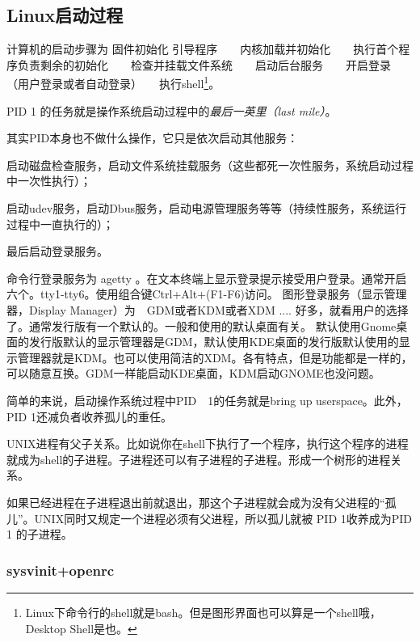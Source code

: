 \documentclass[amstex,twoside]{ctexbook}
\newenvironment{insertnote}{ \ttfamily\CJKfamily{KaiTi} }{\vskip 0.5cm }
\begin{document}
\begin{insertnote}
\subsection*{Linux启动过程}
计算机的启动步骤为 固件初始化 \textrightarrow 引导程序　\textrightarrow　内核加载并初始化　\textrightarrow　执行首个程序负责剩余的初始化　\textrightarrow　检查并挂载文件系统　\textrightarrow　启动后台服务　\textrightarrow　开启登录　\textrightarrow　（用户登录或者自动登录）　\textrightarrow　执行shell\footnote{Linux下命令行的shell就是bash。但是图形界面也可以算是一个shell哦，Desktop Shell是也。}。

PID 1 的任务就是操作系统启动过程中的{\em 最后一英里（last mile）}。

其实PID本身也不做什么操作，它只是依次启动其他服务：

启动磁盘检查服务，启动文件系统挂载服务（这些都死一次性服务，系统启动过程中一次性执行）；

启动udev服务，启动Dbus服务，启动电源管理服务等等（持续性服务，系统运行过程中一直执行的）；

最后启动登录服务。

命令行登录服务为 agetty 。在文本终端上显示登录提示接受用户登录。通常开启六个。tty1-tty6。使用组合键Ctrl+Alt+(F1-F6)访问。
图形登录服务（显示管理器，Display Manager）为　GDM或者KDM或者XDM .... 好多，就看用户的选择了。通常发行版有一个默认的。一般和使用的默认桌面有关。
默认使用Gnome桌面的发行版默认的显示管理器是GDM，默认使用KDE桌面的发行版默认使用的显示管理器就是KDM。也可以使用简洁的XDM。各有特点，但是功能都是一样的，可以随意互换。GDM一样能启动KDE桌面，KDM启动GNOME也没问题。

\end{insertnote}

简单的来说，启动操作系统过程中PID　1的任务就是bring up userspace。此外，PID 1还减负者收养孤儿的重任。

\begin{insertnote}
UNIX进程有父子关系。比如说你在shell下执行了一个程序，执行这个程序的进程就成为shell的子进程。子进程还可以有子进程的子进程。形成一个树形的进程关系。
\end{insertnote}

如果已经进程在子进程退出前就退出，那这个子进程就会成为没有父进程的“孤儿”。UNIX同时又规定一个进程必须有父进程，所以孤儿就被 PID 1收养成为PID 1 的子进程。


\subsubsection{sysvinit+openrc}
\end{document}
